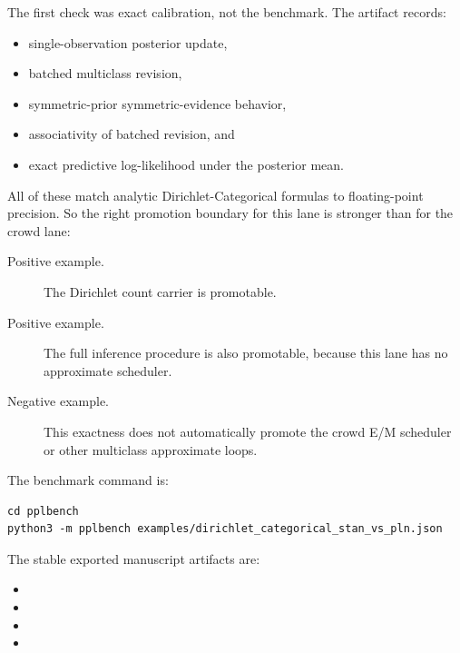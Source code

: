 \documentclass[11pt,openany]{report}
\begin{document}
The first check was exact calibration, not the benchmark.  The artifact
records:
\begin{itemize}
\item single-observation posterior update,
\item batched multiclass revision,
\item symmetric-prior symmetric-evidence behavior,
\item associativity of batched revision, and
\item exact predictive log-likelihood under the posterior mean.
\end{itemize}
All of these match analytic Dirichlet-Categorical formulas to floating-point
precision.  So the right promotion boundary for this lane is stronger than for
the crowd lane:
\begin{description}
\item[Positive example.] The Dirichlet count carrier is promotable.
\item[Positive example.] The full inference procedure is also promotable,
because this lane has no approximate scheduler.
\item[Negative example.] This exactness does not automatically promote the
crowd E/M scheduler or other multiclass approximate loops.
\end{description}

The benchmark command is:
\begin{lstlisting}
cd pplbench
python3 -m pplbench examples/dirichlet_categorical_stan_vs_pln.json
\end{lstlisting}

The stable exported manuscript artifacts are:
\begin{itemize}
\item {}
\item {}
\item {}
\item {}
\end{itemize}
\end{document}
